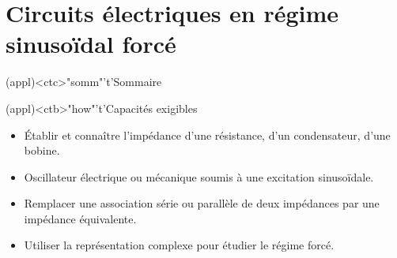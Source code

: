 \documentclass[../../main/main.tex]{subfiles}
\begin{document}
\setcounter{chapter}{5}


\chapter{Circuits électriques en régime sinusoïdal forcé}

\vspace*{\fill}

\begin{tcn}(appl)<ctc>"somm"'t'{Sommaire}
	\let\item\olditem
	\vspace{-15pt}
	\minitoc
	\vspace{-25pt}
\end{tcn}

\begin{tcn}[sidebyside](appl)<ctb>"how"'t'{Capacités exigibles}
	\begin{itemize}[label=\rcheck]
		\item Établir et connaître l'impédance d'une résistance, d'un
		      condensateur, d'une bobine.
		\item Oscillateur électrique ou mécanique soumis à une excitation
		      sinusoïdale.
	\end{itemize}
	\tcblower
	\begin{itemize}[label=\rcheck]
		\item Remplacer une association série ou parallèle de deux impédances par
		      une impédance équivalente.
		\item Utiliser la représentation complexe pour étudier le régime forcé.
	\end{itemize}
\end{tcn}

\vspace*{\fill}
\newpage
\vspace*{\fill}
\end{document}
